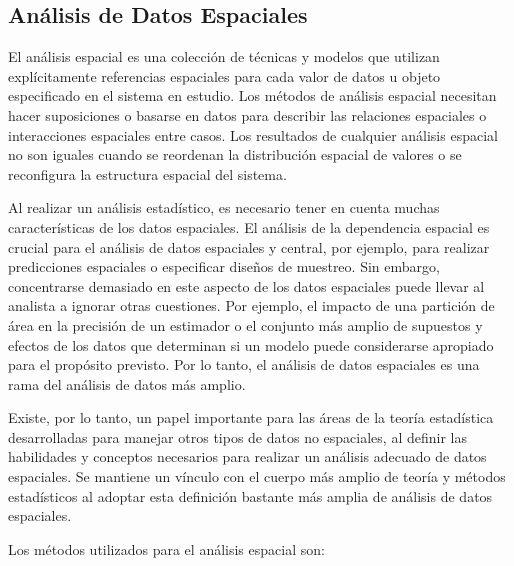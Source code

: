 \subsection{Análisis de Datos Espaciales}

El análisis espacial es una colección de técnicas y modelos que utilizan explícitamente referencias espaciales para cada valor de datos u objeto especificado en el sistema en estudio. Los métodos de análisis espacial necesitan hacer suposiciones o basarse en datos para describir las relaciones espaciales o interacciones espaciales entre casos. Los resultados de cualquier análisis espacial no son iguales cuando se reordenan la distribución espacial de valores o se reconfigura la estructura espacial del sistema. \parencite{bk_haining2003spdat}

Al realizar un análisis estadístico, es necesario tener en cuenta muchas características de los datos espaciales. El análisis de la dependencia espacial es crucial para el análisis de datos espaciales y central, por ejemplo, para realizar predicciones espaciales o especificar diseños de muestreo. Sin embargo, concentrarse demasiado en este aspecto de los datos espaciales puede llevar al analista a ignorar otras cuestiones. Por ejemplo, el impacto de una partición de área en la precisión de un estimador o el conjunto más amplio de supuestos y efectos de los datos que determinan si un modelo puede considerarse apropiado para el propósito previsto. Por lo tanto, el análisis de datos espaciales es una rama del análisis de datos más amplio. \parencite{bk_haining2003spdat}

Existe, por lo tanto, un papel importante para las áreas de la teoría estadística desarrolladas para manejar otros tipos de datos no espaciales, al definir las habilidades y conceptos necesarios para realizar un análisis adecuado de datos espaciales. Se mantiene un vínculo con el cuerpo más amplio de teoría y métodos estadísticos al adoptar esta definición bastante más amplia de análisis de datos espaciales. \parencite{bk_haining2003spdat}

Los métodos utilizados para el análisis espacial son:

